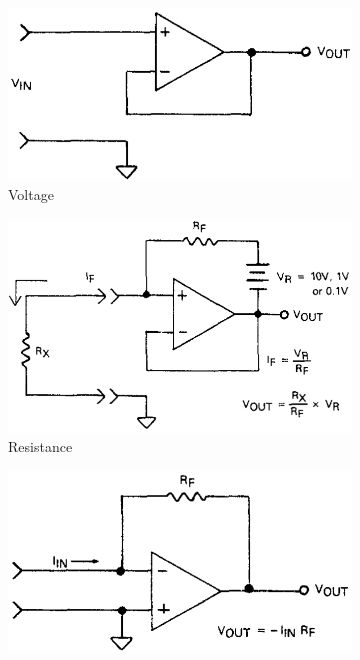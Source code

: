 \begin{figure}[p]
    \begin{subfigure}[b]{\textwidth}
    \centering
        \includegraphics{figuras/instrumental/617volts.png}
        \caption{Voltage}
    \end{subfigure}
    \begin{subfigure}[b]{\textwidth}
    \centering
        \includegraphics{figuras/instrumental/617ohms.png}
        \caption{Resistance}
    \end{subfigure}
    \begin{subfigure}[b]{\textwidth}
    \centering
        \includegraphics{figuras/instrumental/617amps.png}

\end{subfigure}
\end{figure}
